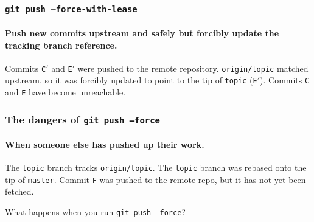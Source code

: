 \documentclass{beamer}
\newcommand\gitcmd[1]{\texttt{git #1}}
\newcommand\grefspec[1]{\texttt{#1}}
\newcommand\gbranch[1]{\texttt{#1}}
\newcommand\gremotebranch[1]{\texttt{#1}}
\begin{document}
\begin{frame}
  \frametitle{\gitcmd{push --force-with-lease}}
  \framesubtitle{Push new commits upstream and safely but forcibly update the tracking branch reference.}

  \begin{figure}
    \centering
  \end{figure}

  Commits \grefspec{C$'$} and \grefspec{E$'$} were pushed to the remote repository.
  \gremotebranch{origin/topic} matched upstream, so it was forcibly updated to point to the tip of \gbranch{topic} (\grefspec{E$'$}).
  Commits \grefspec{C} and \grefspec{E} have become unreachable.
\end{frame}

\begin{frame}
  \frametitle{The dangers of \gitcmd{push --force}}
  \framesubtitle{When someone else has pushed up their work.}

  The \gbranch{topic} branch tracks \gremotebranch{origin/topic}.
  The \gbranch{topic} branch was rebased onto the tip of \gbranch{master}.
  Commit \grefspec{F} was pushed to the remote repo, but it has not yet been fetched.

  \begin{figure}
    \centering
  \end{figure}

  What happens when you run \gitcmd{push --force}?
\end{frame}
\end{document}
